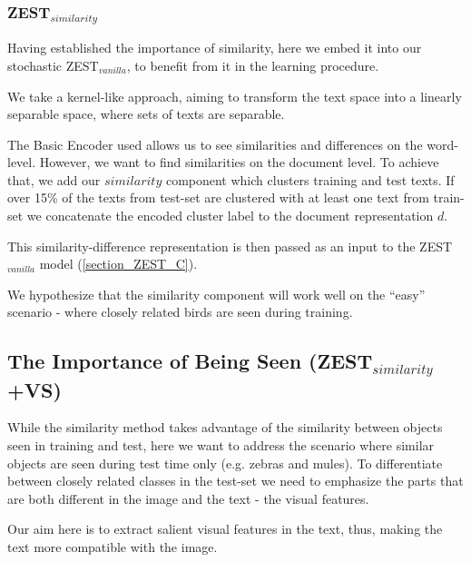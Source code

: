 \documentclass[11pt,a4paper]{article}
\begin{document}
\subsubsection{ZEST$_{similarity}$}

Having established the importance of similarity, here we embed it into our stochastic ZEST$_{vanilla}$, to benefit from it in the learning procedure. \par

We take a kernel-like approach, aiming to transform the text space into a linearly separable space, where sets of texts are separable. \par

The Basic Encoder used allows us to see similarities and differences on the word-level. However, we want to find similarities on the document level. To achieve that, we add our $similarity$ component which clusters training and test texts. If over 15\% of the texts from test-set are clustered with at least one text from train-set we concatenate the encoded cluster label to the document representation $d$. \par

This similarity-difference representation is then passed as an input to the ZEST$_{vanilla}$ model (\ref{section_ZEST_C}). \par

We hypothesize that the similarity component will work well on the \enquote{easy} scenario - where closely related birds are seen during training. \par

\subsection{The Importance of Being Seen (ZEST$_{similarity}$+VS)}

While the similarity method takes advantage of the similarity between objects seen in training and test, here we want to address the scenario where similar objects are seen during test time only (e.g. zebras and mules). To differentiate between closely related classes in the test-set we need to emphasize the parts that are both different in the image and the text - the visual features. \par

Our aim here is to extract salient visual features in the text, thus, making the text more compatible with the image. 

 \par
 
\end{document}
